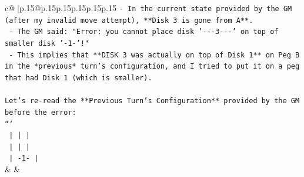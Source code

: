 \documentclass{article}
\begin{document}
{\begin{supertabular}{c@{$\;$}|p{.15\linewidth}@{}p{.15\linewidth}p{.15\linewidth}p{.15\linewidth}p{.15\linewidth}p{.15\linewidth}}
{{{\texttt{{-} In the current state provided by the GM (after my invalid move attempt), **Disk 3 is gone from A**.} \\
\texttt{  {-} The GM said: "Error: you cannot place disk '{-}{-}{-}3{-}{-}{-}' on top of smaller disk '{-}1{-}'!"} \\
\texttt{  {-} This implies that **DISK 3 was actually on top of Disk 1** on Peg B in the *previous* turn's configuration, and I tried to put it on a peg that had Disk 1 (which is smaller).} \\
\\ 
\texttt{Let's re{-}read the **Previous Turn's Configuration** provided by the GM before the error:} \\
\texttt{```} \\
\texttt{   |       |       |   } \\
\texttt{   |       |       |   } \\
\texttt{   |      {-}1{-}      |} \\
            }
        }
    }
    & & \\ \\


\end{supertabular}}
\end{document}

